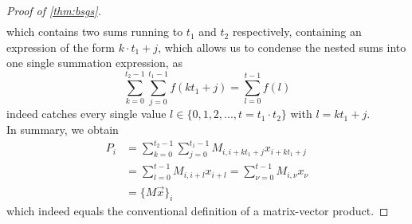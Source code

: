 \begin{proof}[Proof of \cref{thm:bsgs}]
\begin{align*}
  \end{align*}
  which contains two sums running to $t_1$ and $t_2$ respectively, containing an expression of the form $k \cdot t_1 + j$, which allows us to condense the nested sums into one single summation expression, as $$\sum_{k=0}^{t_2-1} \sum_{j=0}^{t_1-1} f(kt_1+j) = \sum_{l=0}^{t-1} f(l)$$ indeed catches every single value $l \in \{0, 1, 2, ..., t=t_1 \cdot t_2\}$ with $l = kt_1+j$. \\
  In summary, we obtain
  \begin{align*}
    P_i & = \sum_{k=0}^{t_2-1} \sum_{j=0}^{t_1-1} M_{i,i+kt_1+j} x_{i+kt_1+j} \\
        & = \sum_{l=0}^{t-1} M_{i,i+l} x_{i+l}
    = \sum_{\nu=0}^{t-1} M_{i,\nu} x_{\nu}                                    \\
        & = \big\{M \vec{x}\big\}_i
  \end{align*}
  which indeed equals the conventional definition of a matrix-vector product.
\end{proof}
